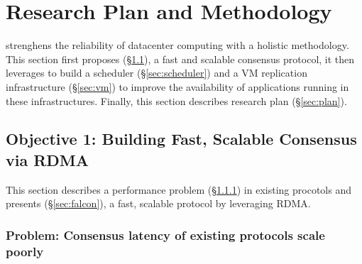 \vspace{-.15in}\section{Research Plan and Methodology}
\label{sec:rep}\vspace{-.075in}

\xxx strenghens the reliability of datacenter computing with a holistic 
methodology. This section first proposes \falcon (\S\ref{sec:protocol}), a fast 
and scalable consensus protocol, it then leverages \falcon to build a scheduler 
(\S\ref{sec:scheduler}) and a VM replication infrastructure (\S\ref{sec:vm}) to 
improve the availability of applications running in these infrastructures. 
Finally, this section describes research plan (\S\ref{sec:plan}).

\vspace{-.15in}\subsection{Objective 1: Building Fast, Scalable Consensus via
RDMA}\label{sec:protocol}\vspace{-.075in}

This section describes a performance problem (\S\ref{sec:latency-problem}) in 
existing \paxos procotols and presents \falcon (\S\ref{sec:falcon}), a 
fast, scalable \paxos protocol by leveraging RDMA.

\vspace{-.15in}
\subsubsection{Problem: Consensus latency of existing \paxos 
protocols scale poorly} 
\label{sec:latency-problem}\vspace{-.075in}



